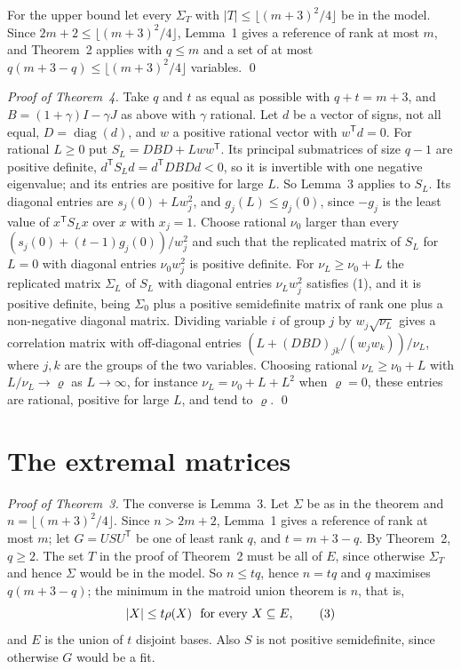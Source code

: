 \documentclass[11pt,letterpaper,reqno]{amsart}
\theoremstyle{spaced}
\begin{document}
For the upper bound let every \(\Sigma_T\) with \(\lvert T\rvert \le \lfloor (m+3)^2/4 \rfloor\) be in the model. Since \(2m+2 \le \lfloor (m+3)^2/4 \rfloor\), Lemma~1 gives a reference of rank at most \(m\), and Theorem~2 applies with \(q \le m\) and a set of at most \(q(m+3-q) \le \lfloor (m+3)^2/4 \rfloor\) variables. \qed

\emph{Proof of Theorem~4.} Take \(q\) and \(t\) as equal as possible with \(q + t = m+3\), and \(B = (1+\gamma)I - \gamma J\) as above with \(\gamma\) rational. Let \(d\) be a vector of signs, not all equal, \(D = \operatorname{diag}(d)\), and \(w\) a positive rational vector with \(w^{\mathsf T} d = 0\). For rational \(L \ge 0\) put \(S_L = D B D + L w w^{\mathsf T}\). Its principal submatrices of size \(q-1\) are positive definite, \(d^{\mathsf T} S_L d = d^{\mathsf T} D B D d < 0\), so it is invertible with one negative eigenvalue; and its entries are positive for large \(L\). So Lemma~3 applies to \(S_L\). Its diagonal entries are \(s_j(0) + L w_j^2\), and \(g_j(L) \le g_j(0)\), since \(-g_j\) is the least value of \(x^{\mathsf T} S_L x\) over \(x\) with \(x_j = 1\). Choose rational \(\nu_0\) larger than every \((s_j(0) + (t-1) g_j(0))/w_j^2\) and such that the replicated matrix of \(S_L\) for \(L = 0\) with diagonal entries \(\nu_0 w_j^2\) is positive definite. For \(\nu_L \ge \nu_0 + L\) the replicated matrix \(\Sigma_L\) of \(S_L\) with diagonal entries \(\nu_L w_j^2\) satisfies (1), and it is positive definite, being \(\Sigma_0\) plus a positive semidefinite matrix of rank one plus a non-negative diagonal matrix. Dividing variable \(i\) of group \(j\) by \(w_j \sqrt{\nu_L}\) gives a correlation matrix with off-diagonal entries \((L + (D B D)_{jk}/(w_j w_k))/\nu_L\), where \(j, k\) are the groups of the two variables. Choosing rational \(\nu_L \ge \nu_0 + L\) with \(L/\nu_L \to \varrho\) as \(L \to \infty\), for instance \(\nu_L = \nu_0 + L + L^2\) when \(\varrho = 0\), these entries are rational, positive for large \(L\), and tend to \(\varrho\). \qed

\hypertarget{the-extremal-matrices}{%
\section{The extremal matrices}\label{the-extremal-matrices}}

\begingroup{} \emph{Proof of Theorem~3.} The converse is Lemma~3. Let \(\Sigma\) be as in the theorem and \(n = \lfloor (m+3)^2/4 \rfloor\). Since \(n > 2m+2\), Lemma~1 gives a reference of rank at most \(m\); let \(G = U S U^{\mathsf T}\) be one of least rank \(q\), and \(t = m+3-q\). By Theorem~2, \(q \ge 2\). The set \(T\) in the proof of Theorem~2 must be all of \(E\), since otherwise \(\Sigma_T\) and hence \(\Sigma\) would be in the model. So \(n \le tq\), hence \(n = tq\) and \(q\) maximises \(q(m+3-q)\); the minimum in the matroid union theorem is \(n\), that is,
\[\lvert X\rvert \le t\rho(X) \ \text{ for every } X \subseteq E, \tag{3}\postdisplaypenalty=10000 \]
and \(E\) is the union of \(t\) disjoint bases. Also \(S\) is not positive semidefinite, since otherwise \(G\) would be a fit.\par\endgroup
\end{document}
